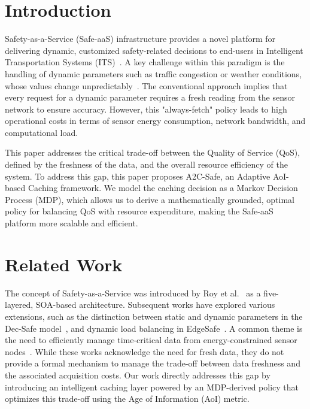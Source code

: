 \documentclass[journal]{IEEEtran}
\begin{document}
\section{Introduction}
 Safety-as-a-Service (Safe-aaS) infrastructure provides a novel platform for delivering dynamic, customized safety-related decisions to end-users in Intelligent Transportation Systems (ITS)~\cite{roy2018safe, pradhan2023dec}. A key challenge within this paradigm is the handling of dynamic parameters such as traffic congestion or weather conditions, whose values change unpredictably~\cite{roy2022micro, roy2021edgesafe}. The conventional approach implies that every request for a dynamic parameter requires a fresh reading from the sensor network to ensure accuracy. However, this "always-fetch" policy leads to high operational costs in terms of sensor energy consumption, network bandwidth, and computational load.

This paper addresses the critical trade-off between the Quality of Service (QoS), defined by the freshness of the data, and the overall resource efficiency of the system. To address this gap, this paper proposes A2C-Safe, an Adaptive AoI-based Caching framework. We model the caching decision as a Markov Decision Process (MDP), which allows us to derive a mathematically grounded, optimal policy for balancing QoS with resource expenditure, making the Safe-aaS platform more scalable and efficient.

\section{Related Work}
The concept of Safety-as-a-Service was introduced by Roy et al.~\cite{roy2018safe} as a five-layered, SOA-based architecture. Subsequent works have explored various extensions, such as the distinction between static and dynamic parameters in the Dec-Safe model~\cite{pradhan2023dec}, and dynamic load balancing in EdgeSafe~\cite{roy2021edgesafe}. A common theme is the need to efficiently manage time-critical data from energy-constrained sensor nodes~\cite{roy2020safe}. While these works acknowledge the need for fresh data, they do not provide a formal mechanism to manage the trade-off between data freshness and the associated acquisition costs. Our work directly addresses this gap by introducing an intelligent caching layer powered by an MDP-derived policy that optimizes this trade-off using the Age of Information (AoI) metric.
\end{document}
